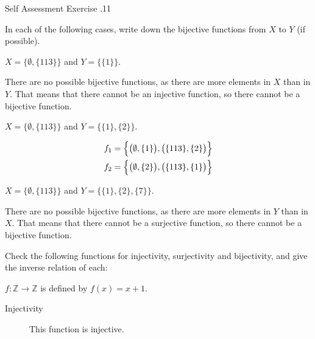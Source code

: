\documentclass[\main/notes.tex]{subfiles}
\begin{document}
			\begin{exercise}{Self Assessment Exercise \thechapter.11}
				\begin{questions}
					\item In each of the following cases, write down the bijective functions from $X$ to $Y$ (if possible).
						\begin{questions}
							\item $X = \bigl\{\emptyset, \{113\}\bigr\}$ and $Y = \bigl\{\{1\}\bigr\}$.\\
								\begin{answer}
									There are no possible bijective functions, as there are more elements in $X$ than in $Y$. That means that there cannot be an injective function, so there cannot be a bijective function.
								\end{answer}
							\item $X = \bigl\{\emptyset, \{113\}\bigr\}$ and $Y = \bigl\{\{1\}, \{2\}\bigr\}$.
								\begin{answer}
									\begin{align*}
										f_{1} &= \Bigl\{\bigl(\emptyset, \{1\}\bigr), \bigl(\{113\}, \{2\}\bigr)\Bigr\}\\
										f_{2} &= \Bigl\{\bigl(\emptyset, \{2\}\bigr), \bigl(\{113\}, \{1\}\bigr)\Bigr\}
									\end{align*}
								\end{answer}
							\item $X = \bigl\{\emptyset, \{113\}\bigr\}$ and $Y = \bigl\{\{1\}, \{2\}, \{7\}\bigr\}$.\\
								\begin{answer}
									There are no possible bijective functions, as there are more elements in $Y$ than in $X$. That means that there cannot be a surjective function, so there cannot be a bijective function.
								\end{answer}
						\end{questions}
					\item Check the following functions for injectivity, surjectivity and bijectivity, and give the inverse relation of each:
						\begin{questions}
							\item $f: \mathbb{Z} \rightarrow \mathbb{Z}$ is defined by $f(x) = x + 1$.
								\begin{answer}
									\begin{description}
										\item[Injectivity] This function is injective.

\end{description}
\end{answer}
\end{questions}
\end{questions}
\end{exercise}
\end{document}
